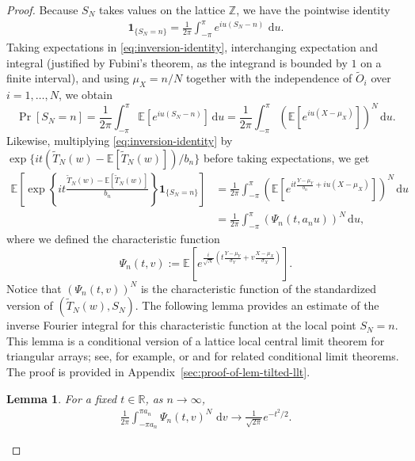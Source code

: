 \documentclass[11pt]{article}
\newtheorem{lem}[thm]{Lemma}
\numberwithin{equation}{section}
\newcommand{\dd}{\,\mathrm{d}}
\newcommand{\Prp}[1]{\Pr\left[#1 \right]}
\newcommand{\reals}{\mathbb R}
\newcommand{\one}{\mathbf{1}}
\newcommand{\ex}[1]{\ensuremath{\mathbb{E}\left[ #1\right]}}
\begin{document}
\begin{proof}
Because $S_N$ takes values on the lattice $\mathbb{Z}$, we have the pointwise identity
\begin{align}
    \label{eq:inversion-identity}
    \one_{\{S_N=n\}} = \frac{1}{2\pi}\int_{-\pi}^{\pi} e^{i u (S_N - n)}\, \dd u.
\end{align}
Taking expectations in \eqref{eq:inversion-identity}, interchanging expectation and integral (justified by Fubini's theorem, as the integrand is bounded by $1$ on a finite interval), and using $\mu_X=n/N$ together with the independence of $\tilde{O}_i$ over $i=1,\ldots,N$, we obtain
\[
\Prp{S_N = n} = \frac{1}{2\pi}\int_{-\pi}^{\pi} \ex{e^{i u (S_N - n)}} \dd u = \frac{1}{2\pi}\int_{-\pi}^{\pi} \left(\ex{e^{i u (X - \mu_X)}} \right)^N \dd u.
\]
Likewise, multiplying \eqref{eq:inversion-identity} by
$\exp\{it(\tilde T_N(w)-\ex{\tilde T_N(w)})/b_n\}$ before taking expectations, we get
\begin{align}
\ex{
\exp\left\{it\frac{\tilde T_N(w)-\ex{\tilde T_N(w)}}{b_n}\right\}
\one_{\{S_N=n\}}}
 & = \frac{1}{2\pi}\int_{-\pi}^{\pi}
\left( \ex{ e^{it \frac{Y-\mu_Y}{b_n}+iu(X-\mu_X)}} \right)^N
\dd u \nonumber \\
& = \frac{1}{2\pi}\int_{-\pi}^{\pi}  \left( \Psi_n(t,a_n u) \right)^N
\dd u,
\label{eq:tilted-llt-integral}
\end{align}
where we defined the characteristic function 
\[
\Psi_n(t,v):= \ex{ e^{\frac{i}{\sqrt{N}} \left(t \frac{Y-\mu_Y}{\sigma_Y}+v \frac{X-\mu_X}{\sigma_X}\right)}}.
\]
Notice that $\left(\Psi_n(t,v)\right)^N$ is the characteristic function of the standardized version of $(\tilde{T}_N(w),S_N)$. The following lemma provides an estimate of the inverse Fourier integral for this characteristic function at the local point $S_N=n$. This lemma is a conditional version of a lattice local central limit theorem for triangular arrays; see, for
example, \cite[Ch.~VII]{petrov1975sums} or
\cite[Ch.~19]{bhattacharya1976normal} and
\cite{holst1981conditional,janson2001moment,klein2019conditional} for related conditional limit theorems. The proof is provided in Appendix~\ref{sec:proof-of-lem-tilted-llt}.
\begin{lem}
    \label{lem:tilted-llt}
    For a fixed $t \in \reals$, as $n \to \infty$,
\begin{align}
\label{eq:tilted-llt}
\frac{1}{2\pi}\int_{-\pi a_n}^{\pi a_n}\Psi_n(t,v)^N\,\dd v
\longrightarrow
\frac{1}{\sqrt{2\pi}}e^{-t^2/2}.
\end{align}
\end{lem}


\end{proof}
\end{document}
